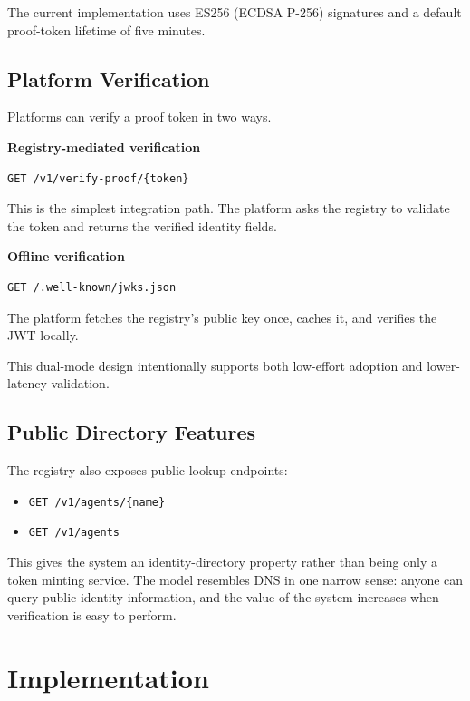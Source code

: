 \documentclass[11pt]{article}
\begin{document}
The current implementation uses ES256 (ECDSA P-256) signatures and a default proof-token lifetime of five minutes.

\subsection{Platform Verification}

Platforms can verify a proof token in two ways.

\textbf{Registry-mediated verification}

\begin{verbatim}
GET /v1/verify-proof/{token}
\end{verbatim}

This is the simplest integration path. The platform asks the registry to validate the token and returns the verified identity fields.

\textbf{Offline verification}

\begin{verbatim}
GET /.well-known/jwks.json
\end{verbatim}

The platform fetches the registry's public key once, caches it, and verifies the JWT locally.

This dual-mode design intentionally supports both low-effort adoption and lower-latency validation.

\subsection{Public Directory Features}

The registry also exposes public lookup endpoints:

\begin{itemize}
  \item \texttt{GET /v1/agents/\{name\}}
  \item \texttt{GET /v1/agents}
\end{itemize}

This gives the system an identity-directory property rather than being only a token minting service. The model resembles DNS in one narrow sense: anyone can query public identity information, and the value of the system increases when verification is easy to perform.

\section{Implementation}
\end{document}
